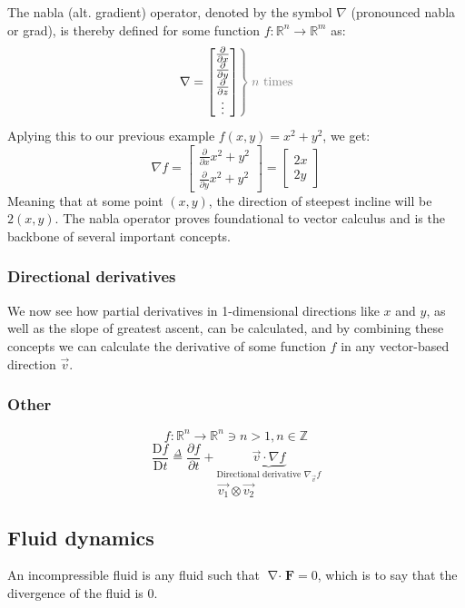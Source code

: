 \documentclass[a4paper, 12pt]{article} %
\newcommand{\fatf}{\mathbf{F}} %
\newcommand{\definedas}{\stackrel{\Delta}{=}} %
\newcommand{\partialder}[2]{\frac{\partial #1}{\partial #2}} %
\newcommand{\materialder}[2]{\frac{\mathrm{D} #1}{\mathrm{D} #2}} %
\DeclareMathOperator{\divergence}{\nabla\cdot} %
\begin{document}
The nabla (alt. gradient) operator, denoted by the symbol $\nabla$ (pronounced nabla or grad), is thereby defined for some function $f:\mathbb{R}^n\rightarrow\mathbb{R}^m$ as:
\begin{equation}
	\left.\nabla=
	\begin{bmatrix}
		\partialder{}{x} \\
		\partialder{}{y} \\
		\partialder{}{z} \\ 
		\vdots 	         \\
	\end{bmatrix}
	\color{gray}\right\} \color{gray}n\text{ times}\color{black}
\end{equation}
Aplying this to our previous example $f(x,y)=x^2+y^2$, we get:
$$\nabla f=\begin{bmatrix}
	\partialder{}{x}x^2+y^2\\
	\partialder{}{y}x^2+y^2	
\end{bmatrix}=\begin{bmatrix}
	2x\\
	2y
\end{bmatrix}$$
Meaning that at some point $(x,y)$, the direction of steepest incline will be $2(x,y)$. The nabla operator proves foundational to vector calculus and is the backbone of several important concepts.

\subsubsection{Directional derivatives}
We now see how partial derivatives in 1-dimensional directions like $x$ and $y$, as well as the slope of greatest ascent, can be calculated, and by combining these concepts we can calculate the derivative of some function $f$ in any vector-based direction $\vec{v}$.
\subsubsection{Other}
$$f:\mathbb{R}^n\rightarrow\mathbb{R}^n\ni n>1,n\in\mathbb{Z}$$
\begin{equation}
	\materialder{f}{t}\definedas\partialder{f}{t}+\underbrace{\vec{v}\cdot\nabla f}_{\text{Directional derivative }\nabla_{\vec{v}}f}
\end{equation}
$$\vec{v_1}\otimes\vec{v_2}$$

\subsection{Fluid dynamics}
An incompressible fluid is any fluid such that $\divergence\fatf=0$, which is to say that the divergence of the fluid is 0.
\end{document}
